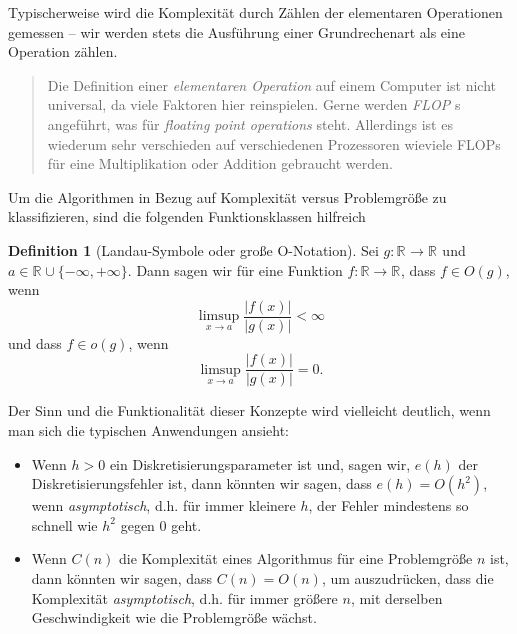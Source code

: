 \documentclass[
]{book}
\providecommand{\tightlist}{%
  \setlength{\itemsep}{0pt}\setlength{\parskip}{0pt}}
\newenvironment {JHSAYS} [0] {\begin{quote}\color{jhsc}} {\end{quote}}
\theoremstyle{definition}
\newtheorem{definition}{Definition}[chapter]
\theoremstyle{definition}
\theoremstyle{definition}
\theoremstyle{definition}
\theoremstyle{remark}
\begin{document}
Typischerweise wird die Komplexität durch Zählen der elementaren Operationen gemessen -- wir werden stets die Ausführung einer Grundrechenart als eine Operation zählen.

\leavevmode\hypertarget{rem-flops}{}%
\begin{JHSAYS}
Die Definition einer \emph{elementaren Operation} auf einem Computer ist nicht universal, da viele Faktoren hier reinspielen. Gerne werden \emph{FLOP}
s angeführt, was für \emph{floating point operations} steht. Allerdings ist es wiederum sehr verschieden auf verschiedenen Prozessoren wieviele FLOPs für eine Multiplikation oder Addition gebraucht werden.

\end{JHSAYS}

Um die Algorithmen in Bezug auf Komplexität versus Problemgröße zu klassifizieren, sind die folgenden Funktionsklassen hilfreich

\begin{definition}[Landau-Symbole oder große O-Notation]
\protect\hypertarget{def:landau-symbs}{}\label{def:landau-symbs}Sei \(g\colon \mathbb R^{} \to \mathbb R^{}\) und \(a\in\mathbb R^{} \cup \{-\infty, +\infty\}\). Dann sagen wir für eine Funktion \(f\colon \mathbb R \to \mathbb R^{}\), dass \(f\in O(g)\), wenn
\begin{equation*}
\limsup_{x\to a} \frac{|f(x)|}{|g(x)|} < \infty
\end{equation*}
und dass \(f\in o(g)\), wenn
\begin{equation*}
\limsup_{x\to a} \frac{|f(x)|}{|g(x)|} = 0.
\end{equation*}
\end{definition}

Der Sinn und die Funktionalität dieser Konzepte wird vielleicht deutlich, wenn man sich die typischen Anwendungen ansieht:

\begin{itemize}
\tightlist
\item
  Wenn \(h> 0\) ein Diskretisierungsparameter ist und, sagen wir, \(e(h)\) der Diskretisierungsfehler ist, dann könnten wir sagen, dass \(e(h) = O(h^2)\), wenn \emph{asymptotisch}, d.h. für immer kleinere \(h\), der Fehler mindestens so schnell wie \(h^2\) gegen \(0\) geht.
\item
  Wenn \(C(n)\) die Komplexität eines Algorithmus für eine Problemgröße \(n\) ist, dann könnten wir sagen, dass \(C(n) = O(n)\), um auszudrücken, dass die Komplexität \emph{asymptotisch}, d.h. für immer größere \(n\), mit derselben Geschwindigkeit wie die Problemgröße wächst.
\end{itemize}
\end{document}
